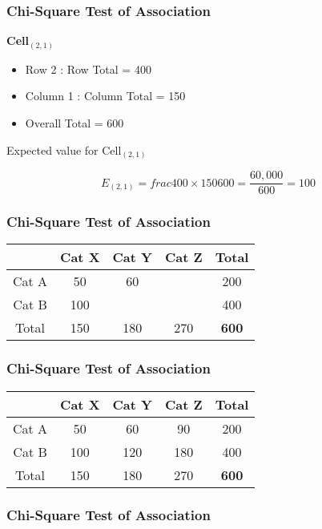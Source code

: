 \documentclass[a4]{beamer}
\begin{document}
\begin{frame}
\frametitle{Chi-Square Test of Association}

\textbf{Cell$_{(2,1)}$}\
\begin{itemize}
\item Row 2 : Row Total = 400
\item Column 1 : Column Total = 150
\item Overall Total = 600
\end{itemize}

Expected value for Cell$_{(2,1)}$

\[ E_{(2,1)} = frac{400 \times 150}{600} = \frac{60,000}{600} = 100 \]
\end{frame}
\begin{frame}
\frametitle{Chi-Square Test of Association}

\LARGE
\begin{center}
\begin{tabular}{|c|c|c|c|c|}
\hline 
 & Cat X & Cat Y & Cat Z & Total  \\ \hline
Cat A & 50 & 60 &  & 200\\ \hline
Cat B & \phantom{s}100\phantom{s}& \phantom{space} & \phantom{space} & 400 \\ \hline
Total & 150 & 180 & 270 &  \textbf{600}\\ \hline
\end{tabular} 
\end{center}

\end{frame}
\begin{frame}
\frametitle{Chi-Square Test of Association}

\LARGE
\begin{center}
\begin{tabular}{|c|c|c|c|c|}
\hline 
 & Cat X & Cat Y & Cat Z & Total  \\ \hline
Cat A & 50 & 60 & 90  & 200\\ \hline
Cat B & \phantom{s}100\phantom{s}& \phantom{s}120\phantom{s} & \phantom{s}180\phantom{s} & 400 \\ \hline
Total & 150 & 180 & 270 &  \textbf{600}\\ \hline
\end{tabular} 
\end{center}
\end{frame}
\begin{frame}
\frametitle{Chi-Square Test of Association}
\end{frame}
\end{document}
